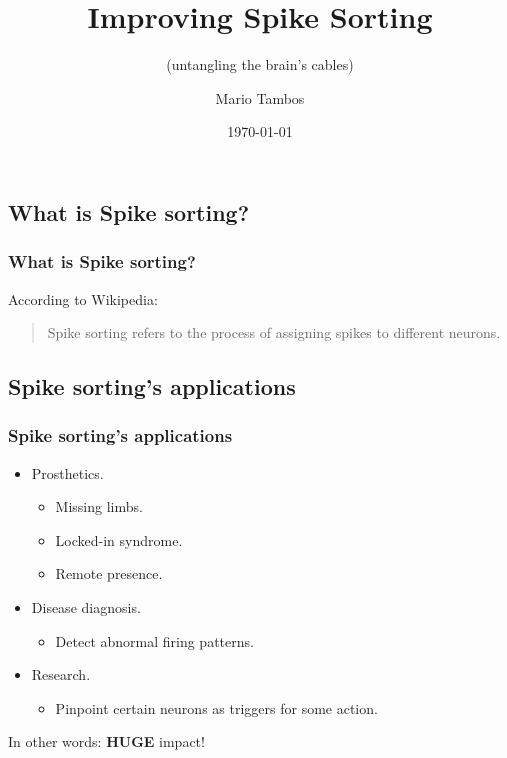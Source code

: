 \documentclass[11pt]{beamer}
\author{Mario Tambos}
\title{Improving Spike Sorting}
\subtitle{(untangling the brain's cables)}
\institute{M.sc. Computer Science \\ TU Berlin}
\date{\today}
\begin{document}
	\maketitle
	\begin{frame}
		\section{What is Spike sorting?}
		\frametitle{What is Spike sorting?}
		According to Wikipedia:
		\begin{quote}
			Spike sorting refers to the process of assigning spikes to different neurons.
		\end{quote}
	\end{frame}
	\begin{frame}
		\section{Spike sorting's applications}
		\frametitle{Spike sorting's applications}
		\begin{itemize}
			\item Prosthetics.
			\begin{itemize}
				\item Missing limbs.
				\item Locked-in syndrome.
				\item Remote presence.
			\end{itemize}
			\item Disease diagnosis.
			\begin{itemize}
				\item Detect abnormal firing patterns.
			\end{itemize}
			\item Research.
			\begin{itemize}
				\item Pinpoint certain neurons as triggers for some action.
			\end{itemize}
		\end{itemize}
	\end{frame}
	\begin{frame}
		In other words: \textbf{HUGE} impact!
	\end{frame}
\end{document}
